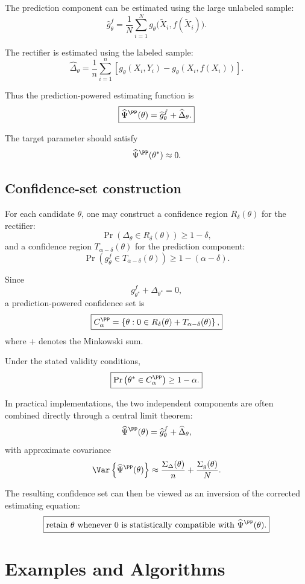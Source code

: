 The prediction component can be estimated using the large unlabeled
sample:
\[
\boxed{
\widehat g_\theta^f
=
\frac{1}{N}
\sum_{i=1}^N
g_\theta
\bigl(
\widetilde X_i,
f(\widetilde X_i)
\bigr).
}
\]

The rectifier is estimated using the labeled sample:
\[
\boxed{
\widehat{\Delta}_\theta
=
\frac{1}{n}
\sum_{i=1}^n
\left[
g_\theta(X_i,Y_i)
-
g_\theta(X_i,f(X_i))
\right].
}
\]

Thus the prediction-powered estimating function is
\[
\boxed{
\widehat\Psi^{\PP}(\theta)
=
\widehat g_\theta^f
+
\widehat{\Delta}_\theta.
}
\]

The target parameter should satisfy
\[
\widehat\Psi^{\PP}(\theta^*)
\approx 0.
\]

\subsection{Confidence-set construction}

For each candidate $\theta$, one may construct a confidence region
$R_\delta(\theta)$ for the rectifier:
\[
\Pr\left(
\Delta_\theta
\in
R_\delta(\theta)
\right)
\ge
1-\delta,
\]
and a confidence region $T_{\alpha-\delta}(\theta)$ for the prediction
component:
\[
\Pr\left(
g_\theta^f
\in
T_{\alpha-\delta}(\theta)
\right)
\ge
1-(\alpha-\delta).
\]

Since
\[
g_{\theta^*}^f+\Delta_{\theta^*}=0,
\]
a prediction-powered confidence set is
\[
\boxed{
C_\alpha^{\PP}
=
\left\{
\theta:
0
\in
R_\delta(\theta)
+
T_{\alpha-\delta}(\theta)
\right\},
}
\]
where $+$ denotes the Minkowski sum.

Under the stated validity conditions,
\[
\boxed{
\Pr\left(
\theta^*
\in
C_\alpha^{\PP}
\right)
\ge
1-\alpha.
}
\]

In practical implementations, the two independent components are often
combined directly through a central limit theorem:
\[
\widehat\Psi^{\PP}(\theta)
=
\widehat g_\theta^f
+
\widehat\Delta_\theta,
\]
with approximate covariance
\[
\Var\left\{
\widehat\Psi^{\PP}(\theta)
\right\}
\approx
\frac{\Sigma_\Delta(\theta)}{n}
+
\frac{\Sigma_g(\theta)}{N}.
\]

The resulting confidence set can then be viewed as an inversion of the
corrected estimating equation:
\[
\boxed{
\text{retain }\theta
\text{ whenever }
0
\text{ is statistically compatible with }
\widehat\Psi^{\PP}(\theta).
}
\]

\section{Examples and Algorithms}

